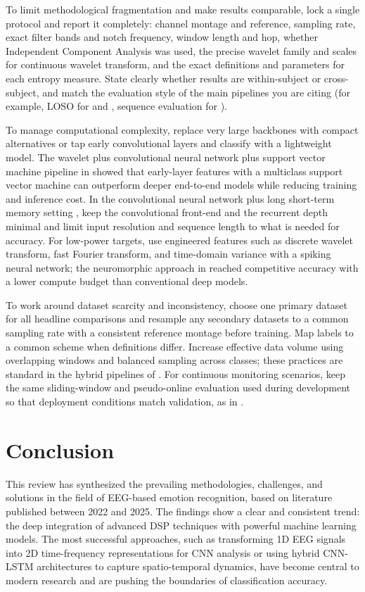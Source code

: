\documentclass[conference]{IEEEtran}
\begin{document}
To limit methodological fragmentation and make results comparable, lock a single protocol and report it completely: channel montage and reference, sampling rate, exact filter bands and notch frequency, window length and hop, whether Independent Component Analysis was used, the precise wavelet family and scales for continuous wavelet transform, and the exact definitions and parameters for each entropy measure. State clearly whether results are within-subject or cross-subject, and match the evaluation style of the main pipelines you are citing (for example, LOSO for \cite{Bagherzadeh2023HybridEEGWaveletCNN_SVM} and \cite{Lee2020MFB_CNN_PilotMentalStates}, sequence evaluation for \cite{Chakravarthi2022EEGHybridCNNLSTM}).

To manage computational complexity, replace very large backbones with compact alternatives or tap early convolutional layers and classify with a lightweight model. The wavelet plus convolutional neural network plus support vector machine pipeline in \cite{Bagherzadeh2023HybridEEGWaveletCNN_SVM} showed that early-layer features with a multiclass support vector machine can outperform deeper end-to-end models while reducing training and inference cost. In the convolutional neural network plus long short-term memory setting \cite{Chakravarthi2022EEGHybridCNNLSTM}, keep the convolutional front-end and the recurrent depth minimal and limit input resolution and sequence length to what is needed for accuracy. For low-power targets, use engineered features such as discrete wavelet transform, fast Fourier transform, and time-domain variance with a spiking neural network; the neuromorphic approach in \cite{Luo2020SNN_EEGEmotion} reached competitive accuracy with a lower compute budget than conventional deep models.

To work around dataset scarcity and inconsistency, choose one primary dataset for all headline comparisons and resample any secondary datasets to a common sampling rate with a consistent reference montage before training. Map labels to a common scheme when definitions differ. Increase effective data volume using overlapping windows and balanced sampling across classes; these practices are standard in the hybrid pipelines of \cite{Bagherzadeh2023HybridEEGWaveletCNN_SVM,Chakravarthi2022EEGHybridCNNLSTM}. For continuous monitoring scenarios, keep the same sliding-window and pseudo-online evaluation used during development so that deployment conditions match validation, as in \cite{Lee2020MFB_CNN_PilotMentalStates}.
\section{Conclusion}
This review has synthesized the prevailing methodologies, challenges, and solutions in the field of EEG-based emotion recognition, based on literature published between 2022 and 2025. The findings show a clear and consistent trend: the deep integration of advanced DSP techniques with powerful machine learning models. The most successful approaches, such as transforming 1D EEG signals into 2D time-frequency representations for CNN analysis or using hybrid CNN-LSTM architectures to capture spatio-temporal dynamics, have become central to modern research and are pushing the boundaries of classification accuracy.
\end{document}
